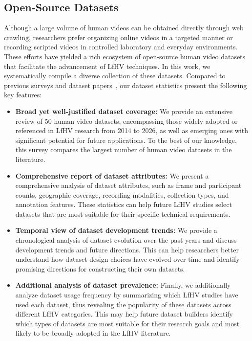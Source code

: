 \documentclass[Afour,sageh,times]{sagej}
\begin{document}
  
\subsection{Open-Source Datasets}\label{sec:data_sources}



Although a large volume of human videos can be obtained directly through web crawling, researchers prefer organizing online videos in a targeted manner or recording scripted videos in controlled laboratory and everyday environments. These efforts have yielded a rich ecosystem of open-source human video datasets that facilitate the advancement of LfHV techniques. 
In this work, we systematically compile a diverse collection of these datasets. Compared to previous surveys and dataset papers~\citep{liu2022hoi4d,grauman2022ego4d,mccarthy2025towards,eze2025learning,hoque2025egodex,banerjee2024hot3d,feng2026human}, our dataset statistics present the following key features:
\begin{itemize}[leftmargin=1em]
    \setlength{\parskip}{0pt}
    \item \textbf{Broad yet well-justified dataset coverage:} We provide an extensive review of 50 human video datasets, encompassing those widely adopted or referenced in LfHV research from 2014 to 2026, as well as emerging ones with significant potential for future applications. To the best of our knowledge, this survey compares the largest number of human video datasets in the literature.
    \item \textbf{Comprehensive report of dataset attributes:} We present a comprehensive analysis of dataset attributes, such as frame and participant counts, geographic coverage, recording modalities, collection types, and annotation features. These statistics can help future LfHV studies select datasets that are most suitable for their specific technical requirements.
    \item \textbf{Temporal view of dataset development trends:} We provide a chronological analysis of dataset evolution over the past years and discuss development trends and future directions. This can help researchers better understand how dataset design choices have evolved over time and identify promising directions for constructing their own datasets.
    \item \textbf{Additional analysis of dataset prevalence:} Finally, we additionally analyze dataset usage frequency by summarizing which LfHV studies have used each dataset, thus revealing the popularity of these datasets across different LfHV categories. This may help future dataset builders identify which types of datasets are most suitable for their research goals and most likely to be broadly adopted in the LfHV literature.
\end{itemize}
\end{document}
